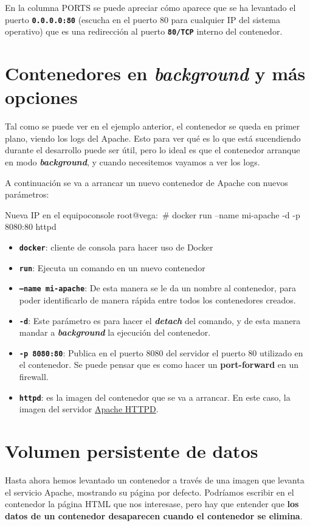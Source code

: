 En la columna PORTS se puede apreciar cómo aparece que se ha levantado el puerto  \textbf{ \texttt{0.0.0.0:80} } (escucha en el puerto 80 para cualquier IP del sistema operativo) que es una redirección al puerto \textbf{\texttt{80/TCP}} interno del contenedor.


\section{Contenedores en \textit{background} y más opciones}
Tal como se puede ver en el ejemplo anterior, el contenedor se queda en primer plano, viendo los logs del Apache. Esto para ver qué es lo que está sucendiendo durante el desarrollo puede ser útil, pero lo ideal es que el contenedor arranque en modo \textbf{\textit{background}}, y cuando necesitemos vayamos a ver los logs.


A continuación se va a arrancar un nuevo contenedor de Apache con nuevos parámetros:
\begin{mycode}{Nueva IP en el equipo}{console}{}
root@vega:~# docker run --name mi-apache -d -p 8080:80 httpd
\end{mycode}

\begin{itemize}
    \item \textbf{\texttt{docker}}: cliente de consola para hacer uso de Docker
    \item \textbf{\texttt{run}}: Ejecuta un comando en un nuevo contenedor
    \item \textbf{\texttt{--name mi-apache}}: De esta manera se le da un nombre al contenedor, para poder identificarlo de manera rápida entre todos los contenedores creados.
    \item \textbf{\texttt{-d}}: Este parámetro es para hacer el \textbf{\textit{detach}} del comando, y de esta manera mandar a \textbf{\textit{background}} la ejecución del contenedor.
    \item \textbf{\texttt{-p 8080:80}}: Publica en el puerto 8080 del servidor el puerto 80 utilizado en el contenedor. Se puede pensar que es como hacer un \textbf{port-forward} en un firewall.
    \item \textbf{\texttt{httpd}}: es la imagen del contenedor que se va a arrancar. En este caso, la imagen del servidor \href{https://hub.docker.com/_/httpd}{Apache HTTPD}.
\end{itemize}


\hypertarget{volumen_persistente_datos}{}
\section{Volumen persistente de datos}
Hasta ahora hemos levantado un contenedor a través de una imagen que levanta el servicio Apache, mostrando su página por defecto. Podríamos escribir en el contenedor la página HTML que nos interesase, pero hay que entender que \textbf{los datos de un contenedor desaparecen cuando el contenedor se elimina}.

